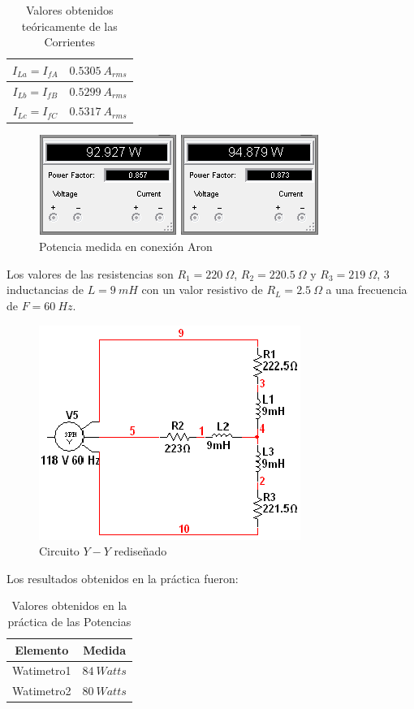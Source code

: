 \documentclass[twocolumn]{IEEEtran}
\begin{document}
\begin{table}[H]
	\centering
\begin{tabular}[c]{|c|c|} \hline
$I_{La} = I_{fA}$ & $0.5305\ A_{rms}$ \\ \hline
$I_{Lb} = I_{fB}$ & $0.5299\ A_{rms}$ \\ \hline
$I_{Lc} = I_{fC}$ & $0.5317\ A_{rms}$ \\ \hline
\end{tabular}
	\caption{Valores obtenidos teóricamente  de las Corrientes}
	\label{tab11}
\end{table}
\begin{figure}[H]
	\centering
		\includegraphics[scale=0.7]{watt1.PNG}
	\caption{Potencia medida en conexión Aron}
	\label{fig10}
\end{figure}
\noindent
Los valores de las resistencias son $R_1 = 220\ \Omega$, $R_2 = 220.5\ \Omega$ y $R_3 = 219\ \Omega$, 3 inductancias de $L = 9\ mH$ con un valor resistivo de $R_L = 2.5\ \Omega$ a una frecuencia de $F = 60\ Hz$.
\begin{figure}[H]
	\centering
		\includegraphics[scale=0.68]{circ1.PNG}
	\caption{Circuito $Y-Y$ rediseñado}
	\label{circ11}
\end{figure}
\noindent
Los resultados obtenidos en la práctica fueron:
\begin{table}[H]
	\centering
\begin{tabular}[c]{|c|c|} \hline
Elemento & Medida \\ \hline
Watimetro1 & $84\ Watts$ \\ \hline
Watimetro2 & $80\ Watts$ \\ \hline
\end{tabular}
	\caption{Valores obtenidos en la práctica de las Potencias}
	\label{tab1}
\end{table}
\end{document}
